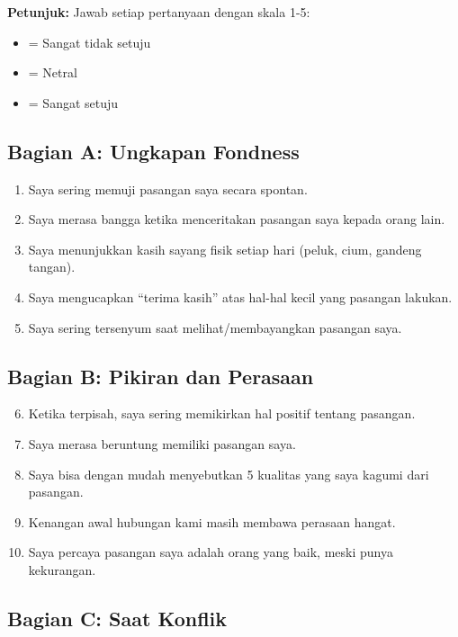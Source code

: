 \begin{exercisebox}
\textbf{Petunjuk:} Jawab setiap pertanyaan dengan skala 1-5:
\begin{itemize}
    \item[1] = Sangat tidak setuju
    \item[3] = Netral
    \item[5] = Sangat setuju
\end{itemize}

\subsection*{Bagian A: Ungkapan Fondness}

\begin{enumerate}
    \item Saya sering memuji pasangan saya secara spontan.
    \item Saya merasa bangga ketika menceritakan pasangan saya kepada orang lain.
    \item Saya menunjukkan kasih sayang fisik setiap hari (peluk, cium, gandeng tangan).
    \item Saya mengucapkan ``terima kasih'' atas hal-hal kecil yang pasangan lakukan.
    \item Saya sering tersenyum saat melihat/membayangkan pasangan saya.
\end{enumerate}

\subsection*{Bagian B: Pikiran dan Perasaan}

\begin{enumerate}
    \setcounter{enumi}{5}
    \item Ketika terpisah, saya sering memikirkan hal positif tentang pasangan.
    \item Saya merasa beruntung memiliki pasangan saya.
    \item Saya bisa dengan mudah menyebutkan 5 kualitas yang saya kagumi dari pasangan.
    \item Kenangan awal hubungan kami masih membawa perasaan hangat.
    \item Saya percaya pasangan saya adalah orang yang baik, meski punya kekurangan.
\end{enumerate}

\subsection*{Bagian C: Saat Konflik}


\end{exercisebox}
